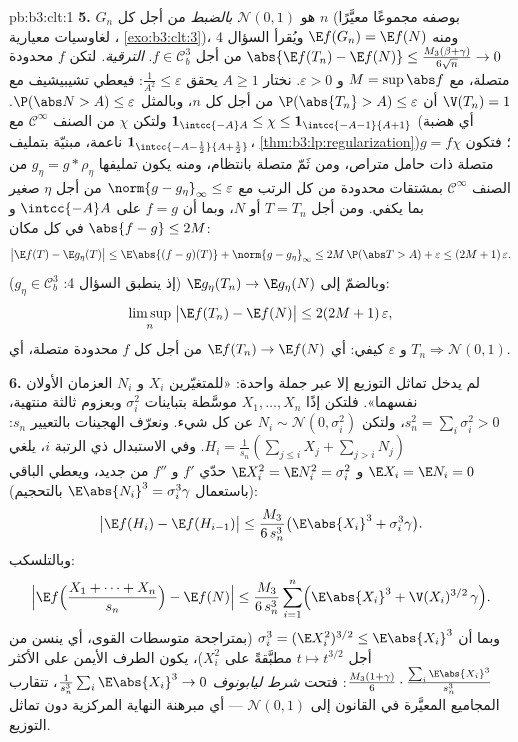 \begin{solution}{pb:b3:clt:1}
\textbf{5.} $G_n$ هو $\mathcal N(0,1)$ \emph{بالضبط} من أجل كل $n$
(بوصفه مجموعًا معيَّرًا لغاوسيات معيارية ، \cref{exo:b3:clt:3})،
ومنه $\E f(G_n) = \E f(N)$ ويُقرأ السؤال 4 $\abs{\E f(T_n) - \E f(N)} \leq
\frac{M_3(\beta+\gamma)}{6\sqrt n} \to 0$ من أجل $f \in
\mathcal C^3_b$.
\emph{الترقية.} لتكن $f$ محدودة متصلة، مع $M = \sup\abs f$
و $\varepsilon > 0$. نختار $A
\geq 1$ يحقق $\frac1{A^2} \leq \varepsilon$: فيعطي تشيبيشيف مع
$\V(T_n) = 1$ أن $\P(\abs{T_n} > A) \leq \varepsilon$ من أجل كل $n$، وبالمثل $\P(\abs N > A) \leq \varepsilon$. ولتكن
$\chi$ من الصنف $\mathcal C^\infty$ مع $\mathbf 1_{\intcc{-A}A} \leq \chi \leq
\mathbf 1_{\intcc{-A-1}{A+1}}$ (أي هضبة ناعمة، مبنيّة
بتمليف $\mathbf 1_{\intcc{-A-\frac12}{A+\frac12}}$، \cref{thm:b3:lp:regularization})؛ فتكون $g = f\chi$ متصلة ذات حامل
متراص، ومن ثَمّ متصلة بانتظام، ومنه يكون تمليفها $g_\eta = g * \rho_\eta$ من
الصنف $\mathcal
C^\infty$ بمشتقات محدودة من كل الرتب مع $\norm{g - g_\eta}_\infty \leq \varepsilon$ من أجل
$\eta$ صغير بما يكفي. ومن أجل $T = T_n$ أو $N$، وبما أن $f = g$
على $\intcc{-A}A$ و $\abs{f - g} \leq 2M$ في كل مكان:
\[
\bigl|\E f(T) - \E g_\eta(T)\bigr| \leq
\E\abs{(f - g)(T)} + \norm{g - g_\eta}_\infty
\leq 2M\,\P(\abs T > A) + \varepsilon \leq
(2M + 1)\,\varepsilon .
\]
وبالضمّ إلى $\E g_\eta(T_n) \to \E g_\eta(N)$ (إذ ينطبق السؤال 4: $g_\eta \in \mathcal C^3_b$):
\[
\limsup_n\;\bigl|\E f(T_n) - \E f(N)\bigr| \leq
2(2M + 1)\,\varepsilon ,
\]
و $\varepsilon$ كيفي: أي $\E f(T_n) \to \E f(N)$ من أجل كل $f$ محدودة متصلة، أي
$T_n \Rightarrow
\mathcal N(0,1)$.

\textbf{6.} لم يدخل تماثل التوزيع إلا عبر جملة واحدة: «للمتغيّرين
$X_i$ و $N_i$ العزمان الأولان نفسهما». فلتكن إذًا $X_1, \dots, X_n$ 
موسَّطة بتباينات $\sigma_i^2$ وبعزوم ثالثة منتهية، $s_n^2 = \sum_i\sigma_i^2 > 0$،
ولتكن $N_i \sim
\mathcal N(0, \sigma_i^2)$  عن كل شيء. ونعرّف الهجينات بالتعيير $s_n$:
$H_i =
\frac1{s_n}(\sum_{j\leq i}X_j + \sum_{j>i}N_j)$. وفي الاستبدال ذي الرتبة $i$، يلغي $\E X_i = \E N_i = 0$ و $\E X_i^2 = \E N_i^2
= \sigma_i^2$
حدّي $f'$ و $f''$ من جديد، ويعطي الباقي (باستعمال $\E\abs{N_i}^3 = \sigma_i^3\gamma$
بالتحجيم):
\[
\bigl|\E f(H_i) - \E f(H_{i-1})\bigr| \leq
\frac{M_3}{6\,s_n^3}\bigl(\E\abs{X_i}^3 +
\sigma_i^3\gamma\bigr) .
\]
وبالتلسكب:
\[
\Bigl|\E f\Bigl(\frac{X_1 + \dots + X_n}{s_n}\Bigr) -
\E f(N)\Bigr| \leq \frac{M_3}{6\,s_n^3}\sum_{i=1}^n
\Bigl(\E\abs{X_i}^3 + \V(X_i)^{3/2}\,\gamma\Bigr) .
\]
وبما أن $\sigma_i^3 = (\E X_i^2)^{3/2} \leq \E\abs{X_i}^3$ (بمتراجحة متوسطات القوى، أي ينسن من أجل $t \mapsto
t^{3/2}$
مطبَّقةً على $X_i^2$)، يكون الطرف الأيمن على الأكثر $\frac{M_3(1 + \gamma)}{6}\cdot
\frac{\sum_i\E\abs{X_i}^3}{s_n^3}$:
فتحت \emph{شرط ليابونوف} $\frac1{s_n^3}\sum_i\E\abs{X_i}^3 \to 0$، تتقارب المجاميع المعيَّرة في
القانون إلى $\mathcal N(0,1)$ --- أي مبرهنة النهاية المركزية دون تماثل
التوزيع.


\end{solution}
